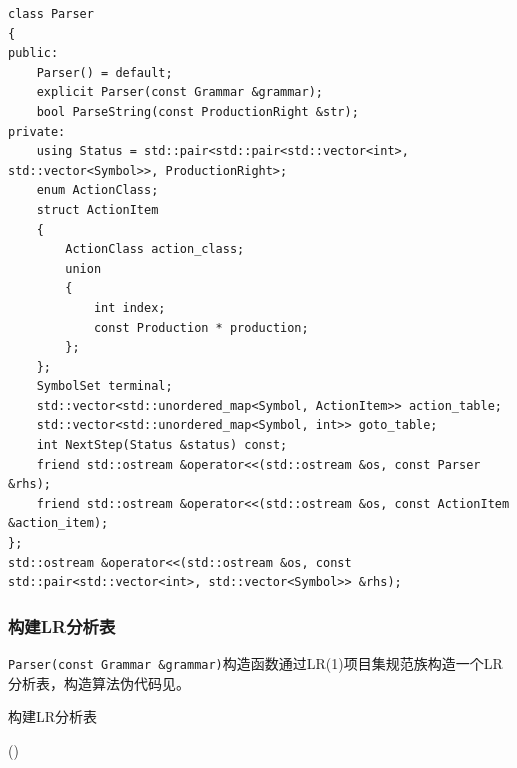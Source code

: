 \documentclass[lang=cn,11pt,a4paper,cite=authornum]{paper}
\begin{document}
\begin{code}
    \begin{verbatim}
class Parser
{
public:
    Parser() = default;
    explicit Parser(const Grammar &grammar);
    bool ParseString(const ProductionRight &str);
private:
    using Status = std::pair<std::pair<std::vector<int>, std::vector<Symbol>>, ProductionRight>;
    enum ActionClass;
    struct ActionItem
    {
        ActionClass action_class;
        union
        {
            int index;
            const Production * production;
        };
    };
    SymbolSet terminal;
    std::vector<std::unordered_map<Symbol, ActionItem>> action_table;
    std::vector<std::unordered_map<Symbol, int>> goto_table;
    int NextStep(Status &status) const;
    friend std::ostream &operator<<(std::ostream &os, const Parser &rhs);
    friend std::ostream &operator<<(std::ostream &os, const ActionItem &action_item);
};
std::ostream &operator<<(std::ostream &os, const std::pair<std::vector<int>, std::vector<Symbol>> &rhs);
\end{verbatim}
\end{code}

\subsubsection{构建LR分析表}

\texttt{Parser(const Grammar &grammar)}构造函数通过LR(1)项目集规范族构造一个LR分析表，构造算法伪代码见。

\begin{algorithm}[!htb]
    \caption{构建LR分析表\label{algo:cons_table}}
    \Fn(){}{
    }
\end{algorithm}
\end{document}
